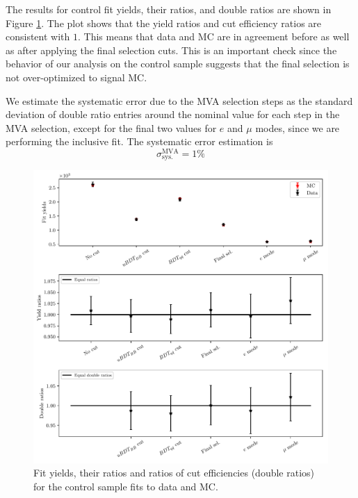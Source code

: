 The results for control fit yields, their ratios, and double ratios are shown in Figure \ref{fig:cs_fits}. The plot shows that the yield ratios and cut efficiency ratios are consistent with $1$. This means that data and MC are in agreement before as well as after applying the final selection cuts. This is an important check since the behavior of our analysis on the control sample suggests that the final selection is not over-optimized to signal MC.

We estimate the systematic error due to the MVA selection steps as the standard deviation of double ratio entries around the nominal value for each step in the MVA selection, except for the final two values for $e$ and $\mu$ modes, since we are performing the inclusive fit. The systematic error estimation is 
\begin{equation}
\sigma_{\mathrm{sys.}}^{\mathrm{MVA}} = 1\%
\end{equation}

\begin{figure}[H]
	\centering
	\captionsetup{width=0.8\linewidth}
	\includegraphics[width=\linewidth]{fig/cs_fits.pdf}
	\caption{Fit yields, their ratios and ratios of cut efficiencies (double ratios) for the control sample fits to data and MC.}
	\label{fig:cs_fits}
\end{figure}

